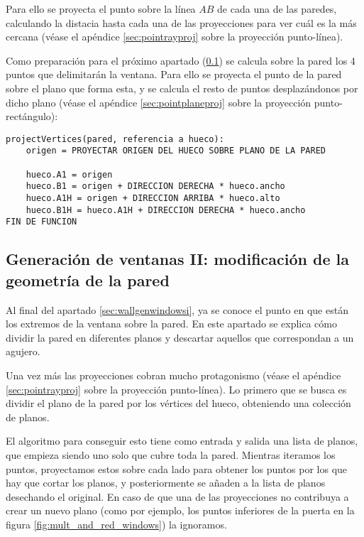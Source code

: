 Para ello se proyecta el punto sobre la línea $AB$ de cada una de las paredes, calculando la distacia hasta cada una de las proyecciones para ver cuál es la más cercana (véase el apéndice \ref{sec:pointrayproj} sobre la proyección punto-línea).

Como preparación para el próximo apartado (\ref{sec:wallgenwindowsii}) se calcula sobre la pared los 4 puntos que delimitarán la ventana. Para ello se proyecta el punto de la pared sobre el plano que forma esta, y se calcula el resto de puntos desplazándonos por dicho plano (véase el apéndice \ref{sec:pointplaneproj} sobre la proyección punto-rectángulo):

\begin{lstlisting}
projectVertices(pared, referencia a hueco):
    origen = PROYECTAR ORIGEN DEL HUECO SOBRE PLANO DE LA PARED
    
    hueco.A1 = origen
    hueco.B1 = origen + DIRECCION DERECHA * hueco.ancho
    hueco.A1H = origen + DIRECCION ARRIBA * hueco.alto
    hueco.B1H = hueco.A1H + DIRECCION DERECHA * hueco.ancho
FIN DE FUNCION
\end{lstlisting}

\subsection{Generación de ventanas II: modificación de la geometría de la pared}
\label{sec:wallgenwindowsii}

Al final del apartado \ref{sec:wallgenwindowsi}, ya se conoce el punto en que están los extremos de la ventana sobre la pared. En este apartado se explica cómo dividir la pared en diferentes planos y descartar aquellos que correspondan a un agujero.

Una vez más las proyecciones cobran mucho protagonismo (véase el apéndice \ref{sec:pointrayproj} sobre la proyección punto-línea). Lo primero que se busca es dividir el plano de la pared por los vértices del hueco, obteniendo una colección de planos.

El algoritmo para conseguir esto tiene como entrada y salida una lista de planos, que empieza siendo uno solo que cubre toda la pared. Mientras iteramos los puntos, proyectamos estos sobre cada lado para obtener los puntos por los que hay que cortar los planos, y posteriormente se añaden a la lista de planos desechando el original. En caso de que una de las proyecciones no contribuya a crear un nuevo plano (como por ejemplo, los puntos inferiores de la puerta en la figura \ref{fig:mult_and_red_windows}) la ignoramos.

